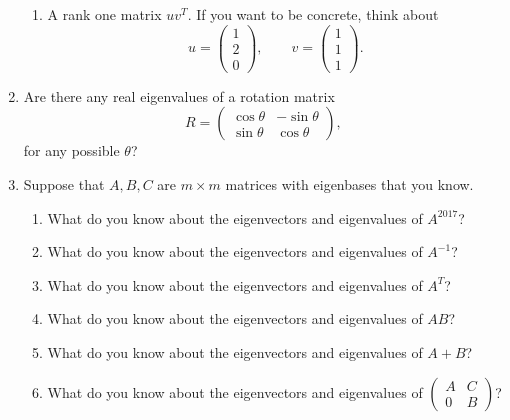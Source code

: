 \documentclass[11pt]{article}
\begin{document}
\begin{enumerate}
\begin{enumerate}
\item A rank one matrix $uv^T$.  If you want to be concrete, think about 
\[u = \begin{pmatrix} 1 \\ 2 \\ 0 \end{pmatrix}, \qquad v = \begin{pmatrix} 1 \\ 1 \\ 1 \end{pmatrix}. \]

\end{enumerate}

\item Are there any real eigenvalues of a rotation matrix 
\[R = \begin{pmatrix} \cos \theta & -\sin \theta \\ \sin \theta & \cos\theta \end{pmatrix}, \]
for any possible $\theta$?

\pagebreak

\item Suppose that $A, B, C$ are $m \times m$ matrices with eigenbases that you know.
\begin{enumerate}

\item What do you know about the eigenvectors and eigenvalues of $A^{2017}$?

\item What do you know about the eigenvectors and eigenvalues of $A^{-1}$?

\item What do you know about the eigenvectors and eigenvalues of $A^T$?

\item What do you know about the eigenvectors and eigenvalues of $AB$?

\item What do you know about the eigenvectors and eigenvalues of $A + B$?

\item What do you know about the eigenvectors and eigenvalues of
$\begin{pmatrix} A & C \\ 0 & B \end{pmatrix}$?

\end{enumerate}

\end{enumerate}
\end{document}
